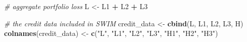 \documentclass[
]{article}
\newenvironment{Shaded}{\begin{snugshade}}{\end{snugshade}}
\newcommand{\CommentTok}[1]{\textcolor[rgb]{0.56,0.35,0.01}{\textit{#1}}}
\newcommand{\KeywordTok}[1]{\textcolor[rgb]{0.13,0.29,0.53}{\textbf{#1}}}
\newcommand{\NormalTok}[1]{#1}
\newcommand{\OperatorTok}[1]{\textcolor[rgb]{0.81,0.36,0.00}{\textbf{#1}}}
\newcommand{\StringTok}[1]{\textcolor[rgb]{0.31,0.60,0.02}{#1}}
\begin{document}
\begin{Shaded}
\begin{Highlighting}[]
\CommentTok{# aggregate portfolio loss}
\NormalTok{  L <-}\StringTok{ }\NormalTok{L1 }\OperatorTok{+}\StringTok{ }\NormalTok{L2 }\OperatorTok{+}\StringTok{ }\NormalTok{L3}
  
\CommentTok{# the credit data included in SWIM}
\NormalTok{  credit_data <-}\StringTok{ }\KeywordTok{cbind}\NormalTok{(L, L1, L2, L3, H)}
  \KeywordTok{colnames}\NormalTok{(credit_data) <-}\StringTok{ }\KeywordTok{c}\NormalTok{(}\StringTok{"L"}\NormalTok{, }\StringTok{"L1"}\NormalTok{, }\StringTok{"L2"}\NormalTok{, }\StringTok{"L3"}\NormalTok{, }\StringTok{"H1"}\NormalTok{, }\StringTok{"H2"}\NormalTok{, }\StringTok{"H3"}\NormalTok{)}
\end{Highlighting}
\end{Shaded}

  
\end{document}
